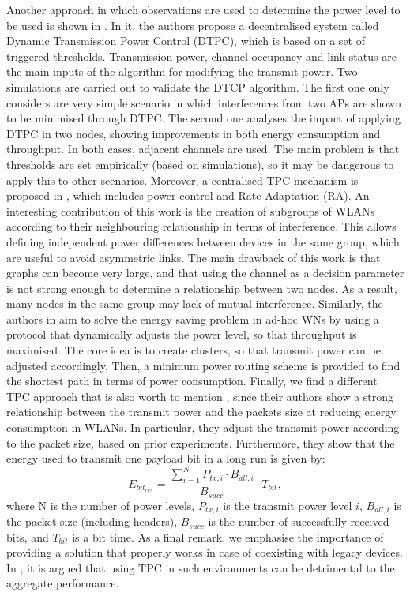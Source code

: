 \documentclass[12pt, a4paper,twoside]{tesi_upf}
\begin{document}
				Another approach in which observations are used to determine the power level to be used is shown in \cite{gandarillas2014dynamic}. In it, the authors propose a decentralised system called Dynamic Transmission Power Control (DTPC), which is based on a set of triggered thresholds. Transmission power, channel occupancy and link status are the main inputs of the algorithm for modifying the transmit power. Two simulations are carried out to validate the DTCP algorithm. The first one only considers are very simple scenario in which interferences from two APs are shown to be minimised through DTPC. The second one analyses the impact of applying DTPC in two nodes, showing improvements in both energy consumption and throughput. In both cases, adjacent channels are used. The main problem is that thresholds are set empirically (based on simulations), so it may be dangerous to apply this to other scenarios. Moreover, a centralised TPC mechanism is proposed in \cite{tang2014joint}, which includes power control and Rate Adaptation (RA). An interesting contribution of this work is the creation of subgroups of WLANs according to their neighbouring relationship in terms of interference. This allows defining independent power differences between devices in the same group, which are useful to avoid asymmetric links. The main drawback of this work is that graphs can become very large, and that using the channel as a decision parameter is not strong enough to determine a relationship between two nodes. As a result, many nodes in the same group may lack of mutual interference. Similarly, the authors in \cite{elbatt2000power} aim to solve the energy saving problem in ad-hoc WNs by using a protocol that dynamically adjusts the power level, so that throughput is maximised. The core idea is to create clusters, so that transmit power can be adjusted accordingly. Then, a minimum power routing scheme is provided to find the shortest path in terms of power consumption. Finally, we find a different TPC approach that is also worth to mention \cite{ebert2000energy}, since their authors show a strong relationship between the transmit power and the packets size at reducing energy consumption in WLANs. In particular, they adjust the transmit power according to the packet size, based on prior experiments. Furthermore, they show that the energy used to transmit one payload bit in a long run is given by:
				\begin{equation}
					E_{bit_{res}} = \frac{\sum_{i=1}^N P_{tx,i} \cdot B_{all,i}}{B_{succ}} \cdot T_{bit},
					\nonumber
				\end{equation}
				where N is the number of power levels, $P_{tx,i}$ is the transmit power level $i$, $B_{all,i}$ is the packet size (including headers), $B_{succ}$ is the number of successfully received bits, and $T_{bit}$ is a bit time. As a final remark, we emphasise the importance of providing a solution that properly works in case of coexisting with legacy devices. In \cite{broustis2010measurement}, it is argued that using TPC in such environments can be detrimental to the aggregate performance.
			
\end{document}
